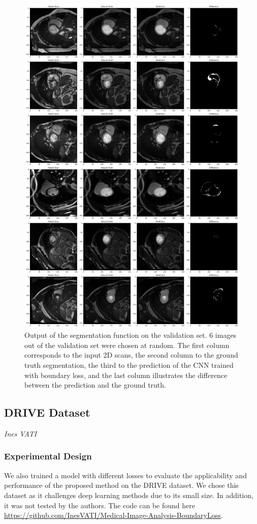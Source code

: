 \documentclass[onecolumn]{article}
\begin{document}
\begin{figure}[H]
    \centering
    \includegraphics[width=0.8\linewidth]{figures/plot2.pdf}
    \caption{Output of the segmentation function on the validation set. 6 images out of the validation set were chosen at random. The first column corresponds to the input 2D scans, the second column to the ground truth segmentation, the third to the prediction of the CNN trained with boundary loss, and the last column illustrates the difference between the prediction and the ground truth.}
    \label{fig:plot2}
\end{figure}


\subsection{DRIVE Dataset}
\textit{Ines VATI}

\subsubsection{Experimental Design}

We also trained a model with different losses to evaluate the applicability and performance of the proposed method on the DRIVE dataset. We chose this dataset as it challenges deep learning methods due to its small size. In addition, it was not tested by the authors. The code can be found here
\url{https://github.com/InesVATI/Medical-Image-Analysis-BoundaryLoss}.
\end{document}
